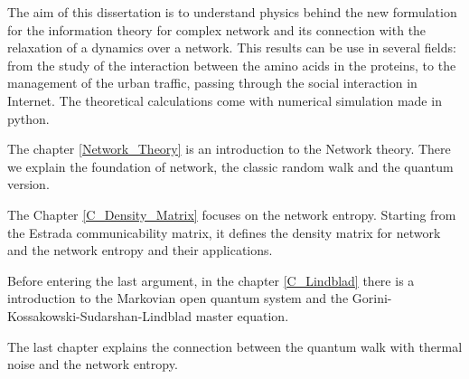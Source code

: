 The aim of this dissertation is to understand physics behind the new formulation for the information theory for complex network and its connection with the relaxation of a dynamics over a network. This results can be use in several fields: from the study of the interaction between the amino acids in the proteins, to the management of the urban traffic, passing through the social interaction in Internet.
The theoretical calculations come with numerical simulation made in python.

The chapter \ref{Network_Theory} is an introduction to the Network theory. There we explain the foundation of network, the classic random walk and the quantum version.

The Chapter \ref{C_Density_Matrix} focuses on the network entropy. Starting from the Estrada communicability matrix, it defines the density matrix for network and the network entropy and their applications.

Before entering the last argument, in the chapter \ref{C_Lindblad} there is a introduction to the Markovian open quantum system and the Gorini-Kossakowski-Sudarshan-Lindblad master equation. 

The last chapter explains the connection between the quantum walk with thermal noise and the network entropy.
